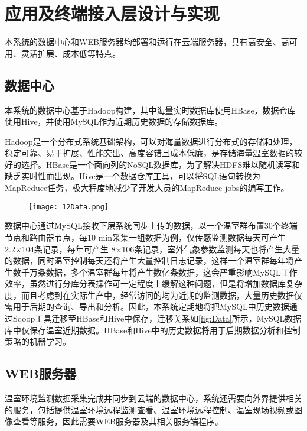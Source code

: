 \section{应用及终端接入层设计与实现}
	本系统的数据中心和WEB服务器均部署和运行在云端服务器，具有高安全、高可用、灵活扩展、成本低等特点。
	\subsection{数据中心}
本系统的数据中心基于Hadoop构建，其中海量实时数据库使用HBase，数据仓库使用Hive，并使用MySQL作为近期历史数据的存储数据库。

Hadoop是一个分布式系统基础架构，可以对海量数据进行分布式的存储和处理，稳定可靠、易于扩展、性能突出、高度容错且成本低廉，是存储海量温室数据的较好的选择。HBase是一个面向列的NoSQL数据库，为了解决HDFS难以随机读写和缺乏实时性而出现。Hive是一个数据仓库工具，可以将SQL语句转换为MapReduce任务，极大程度地减少了开发人员的MapReduce jobs的编写工作。
	  	\begin{figure}[!htp]
  			\centering
 			\texttt{[image: 12Data.png]}
		\end{figure}
数据中心通过MySQL接收下层系统同步上传的数据，以一个温室群布置30个终端节点和路由器节点，每10 min采集一组数据为例，仅传感监测数据每天可产生2.2×104条记录，每年可产生 8×106条记录，室外气象参数监测每天也将产生大量的数据，同时温室控制每天还将产生大量控制日志记录，这样一个温室群每年将产生数千万条数据，多个温室群每年将产生数亿条数据，这会严重影响MySQL工作效率，虽然进行分库分表操作可一定程度上缓解这种问题，但是将增加数据库复杂度，而且考虑到在实际生产中，经常访问的均为近期的监测数据，大量历史数据仅需用于后期的查询、导出和分析。因此，本系统定期地将把MySQL中历史数据通过Sqoop工具迁移至HBase和Hive中保存，迁移关系如\ref{fig:Data}所示，MySQL数据库中仅保存温室近期数据。HBase和Hive中的历史数据将用于后期数据分析和控制策略的机器学习。
 
	\subsection{WEB服务器}
温室环境监测数据采集完成并同步到云端的数据中心，系统还需要向外界提供相关的服务，包括提供温室环境远程监测查看、温室环境远程控制、温室现场视频或图像查看等服务，因此需要WEB服务器及其相关服务端程序。

